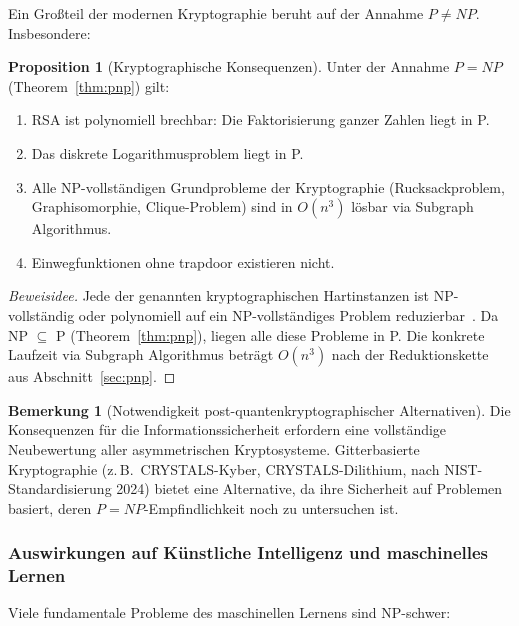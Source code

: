 ﻿\documentclass[a4paper,12pt]{article}
\theoremstyle{definition}
\newtheorem{bemerkung}{Bemerkung}[section]
\newtheorem{proposition}{Proposition}[section]
\begin{document}
Ein Großteil der modernen Kryptographie beruht auf der Annahme $P \neq NP$.
Insbesondere:

\begin{proposition}[Kryptographische Konsequenzen]
\label{prop:krypto}
Unter der Annahme $P = NP$ (Theorem~\ref{thm:pnp}) gilt:
\begin{enumerate}
    \item RSA ist polynomiell brechbar: Die Faktorisierung ganzer Zahlen liegt in P.
    \item Das diskrete Logarithmusproblem liegt in P.
    \item Alle NP-vollständigen Grundprobleme der Kryptographie (Rucksackproblem,
          Graphisomorphie, Clique-Problem) sind in $O(n^3)$ lösbar via Subgraph Algorithmus.
    \item Einwegfunktionen ohne trapdoor existieren nicht.
\end{enumerate}
\end{proposition}

\begin{proof}[Beweisidee]
Jede der genannten kryptographischen Hartinstanzen ist NP-vollständig oder
polynomiell auf ein NP-vollständiges Problem reduzierbar~\cite{garey1979}.
Da NP $\subseteq$ P (Theorem~\ref{thm:pnp}), liegen alle diese Probleme in P.
Die konkrete Laufzeit via Subgraph Algorithmus beträgt $O(n^3)$ nach der
Reduktionskette aus Abschnitt~\ref{sec:pnp}.
\end{proof}

\begin{bemerkung}[Notwendigkeit post-quantenkryptographischer Alternativen]
Die Konsequenzen für die Informationssicherheit erfordern eine vollständige
Neubewertung aller asymmetrischen Kryptosysteme. Gitterbasierte Kryptographie
(z.\,B.\ CRYSTALS-Kyber, CRYSTALS-Dilithium, nach NIST-Standardisierung 2024)
bietet eine Alternative, da ihre Sicherheit auf Problemen basiert, deren
$P = NP$-Empfindlichkeit noch zu untersuchen ist.
\end{bemerkung}

\subsubsection{Auswirkungen auf Künstliche Intelligenz und maschinelles Lernen}

Viele fundamentale Probleme des maschinellen Lernens sind NP-schwer:
\end{document}
